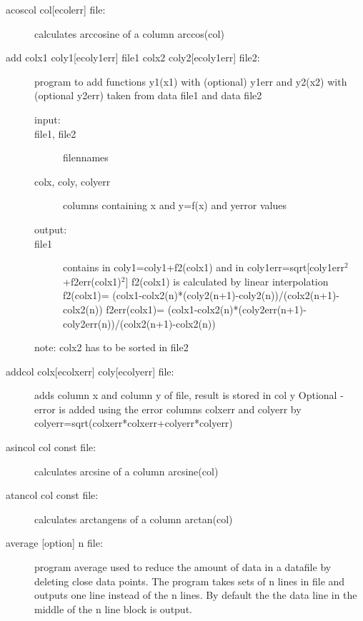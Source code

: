 \begin{description}
\item [\prg acoscol col{[ecolerr]} file:] calculates arccosine of a column arccos(col) 
\item [\prg add colx1 coly1{[ecoly1err]} file1 colx2 coly2{[ecoly1err]} file2:] 
   program to add functions y1(x1) with (optional) y1err and y2(x2) with (optional y2err)
       taken from data file1 and data file2

\begin{description}
 \item [input:]
 \item[ file1, file2]         filennames
 \item [colx, coly, colyerr]  columns containing x and y=f(x) and yerror values
\item[  output:]
\item[  file1]            contains in coly1=coly1+f2(colx1)
                   and in   coly1err=sqrt[coly1err$^2$+f2err(colx1)$^2$]
                   f2(colx1) is calculated by linear
                   interpolation
                   f2(colx1)=
                   (colx1-colx2(n)*(coly2(n+1)-coly2(n))/(colx2(n+1)-colx2(n))
                   f2err(colx1)=
                   (colx1-colx2(n)*(coly2err(n+1)-coly2err(n))/(colx2(n+1)-colx2(n))
\end{description}
  note:            colx2 has to be sorted in file2
\item [\prg addcol  colx{[ecolxerr]} coly{[ecolyerr]} file:] adds column x and column y of file, result is %
stored in col y
Optional - error is added using the error columns colxerr and colyerr
by colyerr=sqrt(colxerr*colxerr+colyerr*colyerr)
\item [\prg asincol col const file:] calculates arcsine of a column arcsine(col) 
\item [\prg atancol col const file:] calculates arctangens of a column %
arctan(col) 
\item [\prg average {[option]} n file:] program average  used  to 
 reduce the amount of data in a datafile by deleting close data points.
 The program takes sets of n lines in file and  outputs one line instead
of the n lines. By default the the data line in the middle of the n line
block is output. 
 

\end{description}
